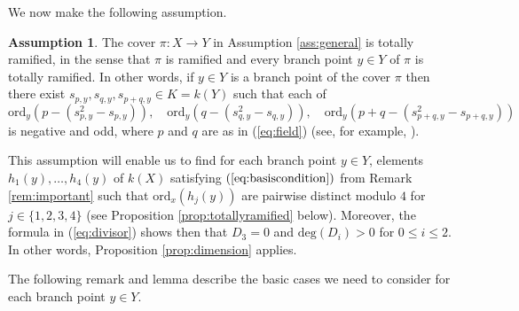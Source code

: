 \documentclass{amsart}
\numberwithin{equation}{section}
\numberwithin{table}{section}
\theoremstyle{plain}
\theoremstyle{definition}
\newtheorem{assume}[theorem]{Assumption}
\theoremstyle{remark}
\begin{document}
We now make the following assumption.

\begin{assume}
\label{ass:totallyramified}
The cover $\pi:X\to Y$ in Assumption \ref{ass:general} is totally ramified, in the sense that $\pi$ is ramified and every branch point $y\in Y$ of $\pi$ is totally ramified. In other words, if $y\in Y$ is a branch point of the cover $\pi$ then there exist $s_{p,y},s_{q,y},s_{p+q,y}\in K=k(Y)$ such that each of 
$$\mathrm{ord}_y(p-(s_{p,y}^2-s_{p,y})), \quad \mathrm{ord}_y(q-(s_{q,y}^2-s_{q,y})) , \quad \mathrm{ord}_y(p+q-(s_{p+q,y}^2-s_{p+q,y}))$$ 
is negative and odd, where $p$ and $q$ are as in (\ref{eq:field}) (see, for example, \cite[Proposition 3.7.8]{Stichtenoth2009}).
\end{assume}

This assumption will enable us to find for each branch point $y\in Y$, elements $h_1(y),\ldots,h_4(y)$ of $k(X)$ satisfying $(\ref{eq:basiscondition})$ from Remark \ref{rem:important} such that $\mathrm{ord}_x(h_j(y))$ are pairwise distinct modulo $4$ for $j\in\{1,2,3,4\}$ (see Proposition \ref{prop:totallyramified} below). Moreover, the formula in (\ref{eq:divisor}) shows then that $D_3=0$ and $\mathrm{deg}(D_i)>0$ for $0\le i \le 2$. In other words, Proposition \ref{prop:dimension} applies. 

The following remark and lemma describe the basic cases we need to consider for each branch point $y \in Y$.
\end{document}
